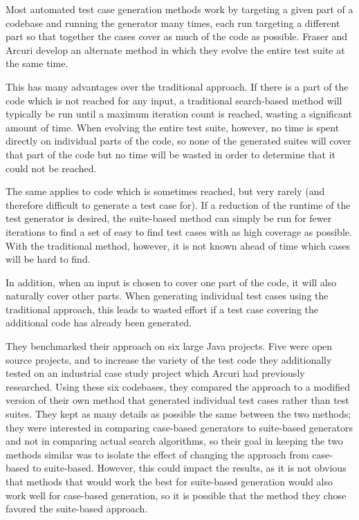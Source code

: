\documentclass{sig-alternate-05-2015}
\begin{document}
Most automated test case generation methods work by targeting a given part of
a codebase and running the generator many times, each run targeting a different 
part so that together the cases cover as much of the code as possible. Fraser
and Arcuri \cite{fraser-arcuri} develop an alternate method in which they
evolve the entire test suite at the same time.

This has many advantages over the traditional approach. If there is a part of
the code which is not reached for any input, a traditional search-based method
will typically be run until a maximum iteration count is reached, wasting a
significant amount of time. When evolving the entire test suite, however, no
time is spent directly on individual parts of the code, so none of the
generated suites will cover that part of the code but no time will be wasted in
order to determine that it could not be reached.

The same applies to code which is sometimes reached, but very rarely (and
therefore difficult to generate a test case for). If a reduction of the runtime
of the test generator is desired, the suite-based method can simply be run for
fewer iterations to find a set of easy to find test cases with as high coverage
as possible. With the traditional method, however, it is not known ahead of
time which cases will be hard to find.

In addition, when an input is chosen to cover one part of the code, it will
also naturally cover other parts. When generating individual test cases using
the traditional approach, this leads to wasted effort if a test case covering
the additional code has already been generated.

They benchmarked their approach on six large Java projects. Five were open
source projects, and to increase the variety of the test code they additionally
tested on an industrial case study project which Arcuri had previously
researched. Using these six codebases, they compared the approach to a modified
version of their own method that generated individual test
cases rather than test suites. They kept as many details as possible the same
between the two methods; they were interested in comparing case-based
generators to suite-based generators and not in comparing actual search
algorithms, so their goal in keeping the two methods similar was to isolate
the effect of changing the approach from case-based to suite-based. However,
this could impact the results, as it is not obvious that methods that would
work the best for suite-based generation would also work well for case-based
generation, so it is possible that the method they chose favored the
suite-based approach.
\end{document}
